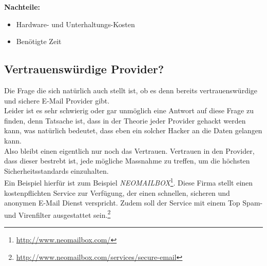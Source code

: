 \textbf{Nachteile:}
\begin{itemize}
    \item Hardware- und Unterhaltungs-Kosten
    \item Benötigte Zeit
\end{itemize}

\subsection{Vertrauenswürdige Provider?}
Die Frage die sich natürlich auch stellt ist, ob es denn bereits vertrauenswürdige und sichere E-Mail Provider gibt. \\
Leider ist es sehr schwierig oder gar unmöglich eine Antwort auf diese Frage zu finden, denn Tatsache ist, dass in der Theorie jeder Provider gehackt werden kann, was natürlich bedeutet, dass eben ein solcher Hacker an die Daten gelangen kann. \\
Also bleibt einen eigentlich nur noch das Vertrauen. Vertrauen in den Provider, dass dieser bestrebt ist, jede mögliche Massnahme zu treffen, um die höchsten Sicherheitsstandards einzuhalten. \\
Ein Beispiel hierfür ist zum Beispiel \textit{NEOMAILBOX}\footnote{\url{http://www.neomailbox.com/}}. Diese Firma stellt einen kostenpflichten Service zur Verfügung, der einen schnellen, sicheren und anonymen E-Mail Dienst verspricht. Zudem soll der Service mit einem Top Spam- und Virenfilter ausgestattet sein.\footnote{\url{http://www.neomailbox.com/services/secure-email}}
